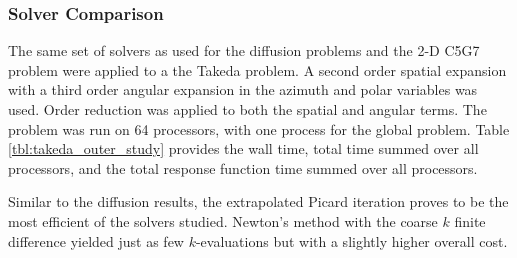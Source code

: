 \subsubsection{Solver Comparison}

The same set of solvers as used for the diffusion problems 
and the 2-D C5G7 problem were applied to a the Takeda problem. A second 
order spatial expansion with a third order angular expansion in the 
azimuth and polar variables was used.  Order reduction was applied to both 
the spatial and angular terms.  The problem was run on 64 processors, with 
one process for the global problem.  Table \ref{tbl:takeda_outer_study} 
provides the wall time, total time summed over all processors, and the 
total response function time summed over all processors.  

Similar to the diffusion results, the extrapolated Picard iteration 
proves to be the most efficient of the solvers studied.  
Newton's method with the coarse $k$ finite difference yielded just as 
few $k$-evaluations but with a slightly higher overall cost.

